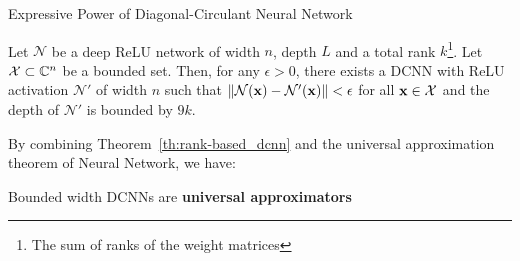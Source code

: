 



\begin{frame}{Expressive Power of Diagonal-Circulant Neural Network}

  \begin{theorem} \label{th:rank-based_dcnn}
    Let $\mathcal{N}$ be a deep ReLU network of width $n$, depth $L$ and a total rank $k$\footnote{The sum of ranks of the weight matrices}.
    Let $\mathcal{X} \subset {\ensuremath \mathbb{C}}^{n}$ be a bounded set.
    Then, for any $\epsilon>0$, there exists a DCNN with ReLU activation $\mathcal{N}'$ of width $n$ such that $\norm{\mathcal{N}(\mathbf{x}) - \mathcal{N}'(\mathbf{x}) } < \epsilon$ for all $\mathbf{x} \in \mathcal{X}$ and the depth of $\mathcal{N}'$ is bounded by $9k$.
  \end{theorem}

  By combining Theorem~\ref{th:rank-based_dcnn} and the universal approximation theorem of Neural Network, we have:
  \begin{corollary} \label{th:universal}
    Bounded width DCNNs are \textbf{universal approximators} 
  \end{corollary}

\end{frame}



